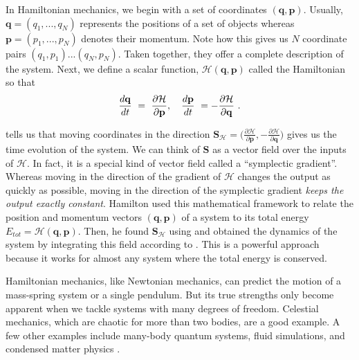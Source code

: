 \documentclass{article}
\begin{document}
In Hamiltonian mechanics, we begin with a set of coordinates $(\mathbf{q},\mathbf{p})$. Usually, $\mathbf{q}=(q_1,...,q_N)$ represents the positions of a set of objects whereas $\mathbf{p}=(p_1,..., p_N)$ denotes their momentum. Note how this gives us $N$ coordinate pairs $(q_1,p_1)...(q_N,p_N)$. Taken together, they offer a complete description of the system. Next, we define a scalar function, $\mathcal{H}(\mathbf{q},\mathbf{p})$ called the Hamiltonian so that
\begin{equation}
\frac{d\mathbf{q}}{dt} ~=~ \frac{\partial \mathcal{H}}{\partial \mathbf{p}}, \quad \frac{d\mathbf{p}}{dt} ~= - \frac{\partial \mathcal{H}}{\partial \mathbf{q}}~.
\eqnlabel{eqn2}
\end{equation}

 tells us that moving coordinates in the direction $\mathbf{S_{\mathcal{H}}} = \big(\frac{\partial \mathcal{H}}{\partial \mathbf{p}}, -\frac{\partial \mathcal{H}}{\partial \mathbf{q}} \big)$ gives us the time evolution of the system. We can think of $\mathbf{S}$ as a vector field over the inputs of $\mathcal{H}$. In fact, it is a special kind of vector field called a ``symplectic gradient''. Whereas moving in the direction of the gradient of $\mathcal{H}$ changes the output as quickly as possible, moving in the direction of the symplectic gradient \textit{keeps the output exactly constant}. Hamilton used this mathematical framework to relate the position and momentum vectors $(\mathbf{q},\mathbf{p})$ of a system to its total energy $E_{tot}=\mathcal{H}(\mathbf{q},\mathbf{p})$. Then, he found $\mathbf{S_{\mathcal{H}}}$ using  and obtained the dynamics of the system by integrating this field according to . This is a powerful approach because it works for almost any system where the total energy is conserved.

Hamiltonian mechanics, like Newtonian mechanics, can predict the motion of a mass-spring system or a single pendulum. But its true strengths only become apparent when we tackle systems with many degrees of freedom. Celestial mechanics, which are chaotic for more than two bodies, are a good example. A few other examples include many-body quantum systems, fluid simulations, and condensed matter physics \cite{reichl1999modern, sakurai1995modern, taylor2005classical, salmon1988hamiltonian, cohen1997photons, girvin2019modern}.
\end{document}
